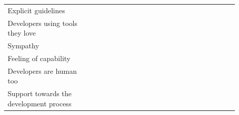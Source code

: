 \documentclass[english, 12pt, a4paper, sci, utf8, a-1b, online]{aaltothesis}
\begin{document}
{\begin{center}
\begin{longtable}{p{0.3\linewidth}p{0.6\linewidth}}
      Explicit guidelines                     & \textcite{the-best-practices-for-a-great-dx} \newline \textcite{what-exactly-is-developer-experience}                                                                                                                                                                                                                       \\
      Developers using tools they love        & \textcite{heroku-dx} \newline \textcite{great-dx-and-the-people-who-make-them} \newline \textcite{how-i-missed-it-before} \newline \textcite{building-the-developer-experience-from-the-ground-up} \newline \textcite{what-is-api-developer-experience-and-why-it-matters}                                                  \\
      Sympathy                                & \textcite{contributing-as-a-designer}                                                                                                                                                                                                                                                                                       \\
      Feeling of capability                   & \textcite{what-is-developer-experience-everydeveloper} \newline \textcite{developer-experience-sanity}                                                                                                                                                                                                                      \\
      Developers are human too                & \textcite{api-developer-experience-dx-resources} \newline \textcite{apis-for-humans-the-rise-of-developer-experience}                                                                                                                                                                                                       \\
      Support towards the development process & \textcite{effective-developer-experience} \newline \textcite{developer-experience-what-and-why}                                                                                                                                                                                                                             \\

\end{longtable}
\end{center}}
\end{document}
